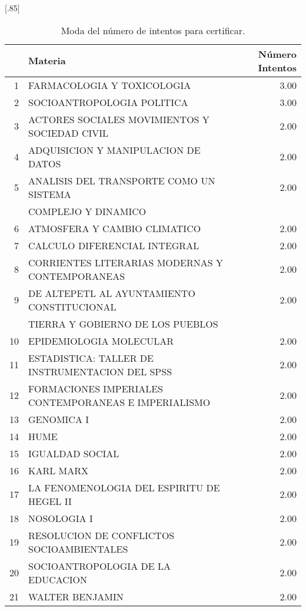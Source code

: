 \documentclass[12pt]{article}
\begin{document}
\begin{table}[ht]
\centering
\scalebox{0.75}[.85]{
\begin{tabular}{rlr}
  \hline
 & Materia & N\'umero Intentos \\ 
  \hline
1 & FARMACOLOGIA Y TOXICOLOGIA & 3.00 \\ 
  2 & SOCIOANTROPOLOGIA POLITICA & 3.00 \\ 
  3 & ACTORES SOCIALES MOVIMIENTOS Y SOCIEDAD CIVIL & 2.00 \\ 
  4 & ADQUISICION Y MANIPULACION DE DATOS & 2.00 \\ 
  5 & ANALISIS DEL TRANSPORTE COMO UN SISTEMA & 2.00 \\ 
   &  COMPLEJO Y DINAMICO &  \\ 
  6 & ATMOSFERA Y CAMBIO CLIMATICO & 2.00 \\ 
  7 & CALCULO DIFERENCIAL INTEGRAL & 2.00 \\ 
  8 & CORRIENTES LITERARIAS MODERNAS Y CONTEMPORANEAS & 2.00 \\ 
  9 & DE ALTEPETL AL AYUNTAMIENTO CONSTITUCIONAL& 2.00 \\ 
  & TIERRA Y GOBIERNO DE LOS PUEBLOS & \\ 
  10 & EPIDEMIOLOGIA MOLECULAR & 2.00 \\ 
  11 & ESTADISTICA: TALLER DE INSTRUMENTACION DEL SPSS & 2.00 \\ 
  12 & FORMACIONES IMPERIALES CONTEMPORANEAS E IMPERIALISMO & 2.00 \\ 
  13 & GENOMICA I & 2.00 \\ 
  14 & HUME & 2.00 \\ 
  15 & IGUALDAD SOCIAL & 2.00 \\ 
  16 & KARL MARX & 2.00 \\ 
  17 & LA FENOMENOLOGIA DEL ESPIRITU DE HEGEL II & 2.00 \\ 
  18 & NOSOLOGIA I & 2.00 \\ 
  19 & RESOLUCION DE CONFLICTOS SOCIOAMBIENTALES & 2.00 \\ 
  20 & SOCIOANTROPOLOGIA DE LA EDUCACION & 2.00 \\ 
  21 & WALTER BENJAMIN & 2.00 \\ 
   \hline
\end{tabular}
}\caption{\label{Moda_Intentos_Certificar} Moda del n\'umero  de intentos para certificar.}
\end{table}
\end{document}
